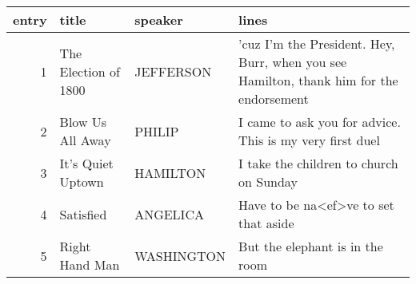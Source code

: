 
\begin{tabular}{r|l|l|l}
\hline
entry & title & speaker & lines\\
\hline
1 & The Election of 1800 & JEFFERSON & 'cuz I'm the President. Hey, Burr, when you see Hamilton, thank him for the endorsement\\
\hline
2 & Blow Us All Away & PHILIP & I came to ask you for advice. This is my very first duel\\
\hline
3 & It's Quiet Uptown & HAMILTON & I take the children to church on Sunday\\
\hline
4 & Satisfied & ANGELICA & Have to be na<ef>ve to set that aside\\
\hline
5 & Right Hand Man & WASHINGTON & But the elephant is in the room\\
\hline
\end{tabular}

